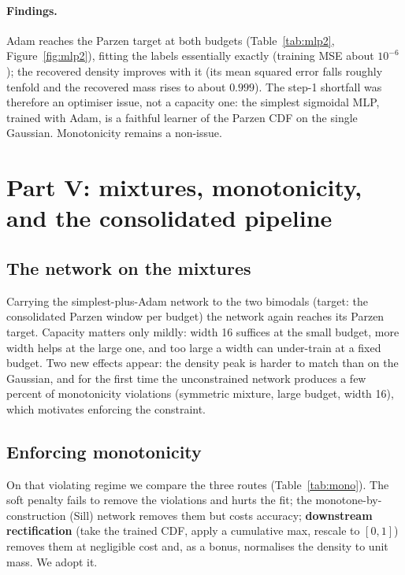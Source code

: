 \documentclass[11pt]{article}
\begin{document}
\paragraph{Findings.} Adam reaches the Parzen target at both budgets (Table~\ref{tab:mlp2},
Figure~\ref{fig:mlp2}), fitting the labels essentially exactly (training MSE about $10^{-6}$); the
recovered density improves with it (its mean squared error falls roughly tenfold and the recovered
mass rises to about $0.999$). The step-1 shortfall was therefore an optimiser issue, not a capacity
one: the simplest sigmoidal MLP, trained with Adam, is a faithful learner of the Parzen CDF on the
single Gaussian. Monotonicity remains a non-issue.

\section{Part V: mixtures, monotonicity, and the consolidated pipeline}

\subsection{The network on the mixtures}

Carrying the simplest-plus-Adam network to the two bimodals (target: the consolidated Parzen window
per budget) the network again reaches its Parzen target. Capacity matters only mildly: width 16
suffices at the small budget, more width helps at the large one, and too large a width can
under-train at a fixed budget. Two new effects appear: the density peak is harder to match than on
the Gaussian, and for the first time the unconstrained network produces a few percent of monotonicity
violations (symmetric mixture, large budget, width 16), which motivates enforcing the constraint.

\subsection{Enforcing monotonicity}

On that violating regime we compare the three routes (Table~\ref{tab:mono}). The soft penalty fails to
remove the violations and hurts the fit; the monotone-by-construction (Sill) network removes them but
costs accuracy; \textbf{downstream rectification} (take the trained CDF, apply a cumulative max,
rescale to $[0,1]$) removes them at negligible cost and, as a bonus, normalises the density to unit
mass. We adopt it.
\end{document}
